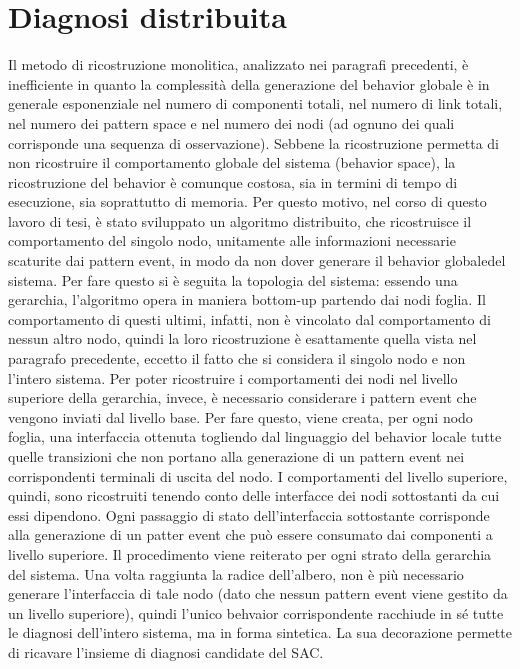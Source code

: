 \section{Diagnosi distribuita}
Il metodo di ricostruzione monolitica, analizzato nei paragrafi precedenti, è inefficiente in quanto la complessità della generazione del behavior globale è in generale esponenziale nel numero di componenti totali, nel numero di link totali, nel numero dei pattern space e nel numero dei nodi (ad ognuno dei quali corrisponde una sequenza di osservazione). Sebbene la ricostruzione permetta di non ricostruire il comportamento globale del sistema (behavior space), la ricostruzione del behavior è comunque costosa, sia in termini di tempo di esecuzione, sia soprattutto di memoria.
Per questo motivo, nel corso di questo lavoro di tesi, è stato sviluppato un algoritmo distribuito, che ricostruisce il comportamento del singolo nodo, unitamente alle informazioni necessarie scaturite dai pattern event, in modo da non dover generare il behavior globaledel sistema. Per fare questo si è seguita la topologia del sistema: essendo una gerarchia, l'algoritmo opera in maniera bottom-up partendo dai nodi foglia. Il comportamento di questi ultimi, infatti, non è vincolato dal comportamento di nessun altro nodo, quindi la loro ricostruzione è esattamente quella vista nel paragrafo precedente, eccetto il fatto che si considera il singolo nodo e non l'intero sistema. Per poter ricostruire i comportamenti dei nodi nel livello superiore della gerarchia, invece, è necessario considerare i pattern event che vengono inviati dal livello base. Per fare questo, viene creata, per ogni nodo foglia, una interfaccia ottenuta togliendo dal linguaggio del behavior locale tutte quelle transizioni che non portano alla generazione di un pattern event nei corrispondenti terminali di uscita del nodo. I comportamenti del livello superiore, quindi, sono ricostruiti tenendo conto delle interfacce dei nodi sottostanti da cui essi dipendono. Ogni passaggio di stato dell'interfaccia sottostante corrisponde alla generazione di un patter event che può essere consumato dai componenti a livello superiore. Il procedimento viene reiterato per ogni strato della gerarchia del sistema.
Una volta raggiunta la radice dell'albero, non è più necessario generare l'interfaccia di tale nodo (dato che nessun pattern event viene gestito da un livello superiore), quindi l'unico behvaior corrispondente racchiude in sé tutte le diagnosi dell'intero sistema, ma in forma sintetica. La sua decorazione permette di ricavare l'insieme di diagnosi candidate del SAC.

